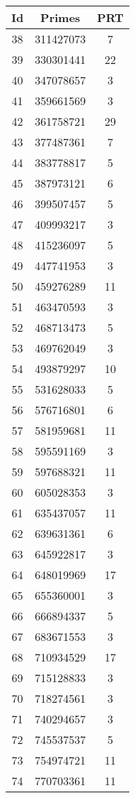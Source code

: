 \begin{spacing}{0.8}
\begin{tabular}{ccc}
\toprule
       Id & Primes & PRT\\
 \midrule
 38 & 311427073 & 7\\
 39 & 330301441 & 22\\
 40 & 347078657 & 3\\
 41 & 359661569 & 3\\
 42 & 361758721 & 29\\
 43 & 377487361 & 7\\
 44 & 383778817 & 5\\
 45 & 387973121 & 6\\
 46 & 399507457 & 5\\
 47 & 409993217 & 3\\
 48 & 415236097 & 5\\
 49 & 447741953 & 3\\
 50 & 459276289 & 11\\
 51 & 463470593 & 3\\
 52 & 468713473 & 5\\
 53 & 469762049 & 3\\
 54 & 493879297 & 10\\
 55 & 531628033 & 5\\
 56 & 576716801 & 6\\
 57 & 581959681 & 11\\
 58 & 595591169 & 3\\
 59 & 597688321 & 11\\
 60 & 605028353 & 3\\
 61 & 635437057 & 11\\
 62 & 639631361 & 6\\
 63 & 645922817 & 3\\
 64 & 648019969 & 17\\
 65 & 655360001 & 3\\
 66 & 666894337 & 5\\
 67 & 683671553 & 3\\
 68 & 710934529 & 17\\
 69 & 715128833 & 3\\
 70 & 718274561 & 3\\
 71 & 740294657 & 3\\
 72 & 745537537 & 5\\
 73 & 754974721 & 11\\
 74 & 770703361 & 11\\
\bottomrule
\end{tabular}
\begin{tabular}{ccc}

\end{tabular}
\end{spacing}
